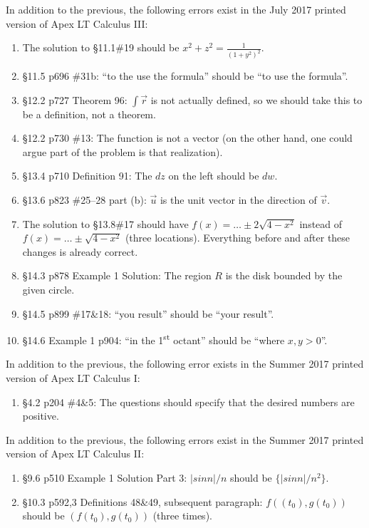 \documentclass{amsart}
\newcommand{\ds}{\displaystyle}
\begin{document}
In addition to the previous, the following errors exist in the July 2017 printed version of Apex LT Calculus III:
\begin{enumerate}
\item The solution to \S11.1\#19 should be $x^2+z^2=\frac1{(1+y^2)^2}$.
\item \S11.5 p696 \#31b: ``to the use the formula'' should be ``to use the formula''.
\item \S12.2 p727 Theorem 96: $\ds\int\vec r$ is not actually defined, so we should take this to be a definition, not a theorem.
\item \S12.2 p730 \#13: The function is not a vector (on the other hand, one could argue part of the problem is that realization).
\item \S13.4 p710 Definition 91: The $dz$ on the left should be $dw$.
\item \S13.6 p823 \#25--28 part (b): $\vec u$ is the unit vector in the direction of $\vec v$.
\item The solution to \S13.8\#17 should have $f(x)=\dots\pm2\sqrt{4-x^2}$ instead of $f(x)=\dots\pm\sqrt{4-x^2}$ (three locations).  Everything before and after these changes is already correct.
\item \S14.3 p878 Example 1 Solution: The region $R$ is the disk bounded by the given circle.
\item \S14.5 p899 \#17\&18: ``you result'' should be ``your result''.
\item \S14.6 Example 1 p904: ``in the 1\textsuperscript{st} octant'' should be ``where $x,y>0$''.
\label{2017-07III}
\end{enumerate}


In addition to the previous, the following error exists in the Summer 2017 printed version of Apex LT Calculus I:
\begin{enumerate}
\item \S4.2 p204 \#4\&5: The questions should specify that the desired numbers are positive.
\label{2017-05I}
\end{enumerate}
\vspace{1in}

In addition to the previous, the following errors exist in the Summer 2017 printed version of Apex LT Calculus II:
\begin{enumerate}
\item \S9.6 p510 Example 1 Solution Part 3: $|sin n|/n$ should be $\{|sin n|/n^2\}$.
\item \S10.3 p592,3 Definitions 48\&49, subsequent paragraph: $f((t_0), g(t_0))$ should be $(f(t_0), g(t_0))$ (three times).
\label{2017-05II}
\end{enumerate}
\end{document}
